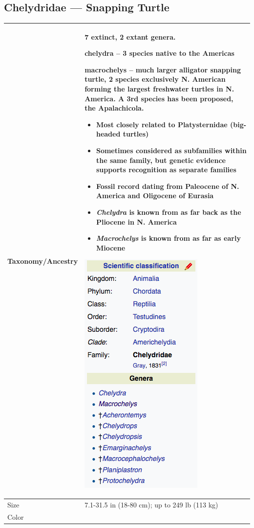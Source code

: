 
\subsection{Chelydridae --- Snapping Turtle}
\begin{center}
\begin{longtabu} to 

	\hline
	Taxonomy/Ancestry &
	7 extinct, 2 extant genera.
	
	\textbf{chelydra} -- 3 species native to the Americas
	
	\textbf{macrochelys} -- much larger alligator snapping turtle, 2 species exclusively N. American forming the largest freshwater turtles in N. America. A 3rd species has been proposed, the Apalachicola.
	\begin{itemize}[noitemsep]
		\item Most closely related to Platysternidae (big-headed turtles)
		\item Sometimes considered as subfamilies within the same family, but genetic evidence supports recognition as separate families
		\item Fossil record dating from Paleocene of N. America and Oligocene of Eurasia
		\item \emph{Chelydra} is known from as far back as the Pliocene in N. America
		\item \emph{Macrochelys} is known from as far as early Miocene
	\end{itemize}
	
	\begin{center} \includegraphics[scale=0.5]{testudines/chelydridae/tax} \end{center}
	 \\
	\hline
	Size & 
	7.1-31.5 in (18-80 cm); up to 249 lb (113 kg)
	\\
	\hline
	Color &
	

\end{longtabu}
\end{center}

